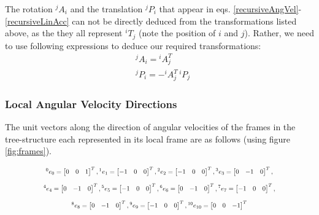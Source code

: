 \documentclass[a4paper,10pt]{article}
\newcommand\scalemath[2]{\scalebox{#1}{\mbox{\ensuremath{\displaystyle #2}}}}
\begin{document}
The rotation ${}^jA_i$ and the translation ${}^jP_i$ that appear in eqs. \ref{recursiveAngVel}-\ref{recursiveLinAcc} can not be directly deduced from the transformations listed above, as the they all represent ${}^iT_j$ (note the position of $i$ and $j$). Rather, we need to use following expressions to deduce our required transformations:
\begin{align}
 &{}^jA_i = {}^iA_j^T \nonumber \\ 
 &{}^jP_i = -{}^iA_j^T\,{}^iP_j \nonumber
\end{align}

\subsubsection{Local Angular Velocity Directions} \label{localAngVelDir}

The unit vectors along the direction of angular velocities of the frames in the tree-structure each represented in its local frame are as follows  (using figure \ref{fig:frames}).

\[
\scalemath{0.75}{{}^0e_0 = \left[\begin{matrix}0 & 0 & 1\end{matrix}\right]^T,
{}^1e_1 = \left[\begin{matrix}-1 & 0 & 0\end{matrix}\right]^T, 
{}^2e_2 = \left[\begin{matrix}-1 & 0 & 0\end{matrix}\right]^T, 
{}^3e_3 = \left[\begin{matrix}0 & -1 & 0\end{matrix}\right]^T,}
\]
\[
\scalemath{0.75}{{}^4e_4 = \left[\begin{matrix}0 & -1 & 0\end{matrix}\right]^T,
{}^5e_5 = \left[\begin{matrix}-1 & 0 & 0\end{matrix}\right]^T, 
{}^6e_6 = \left[\begin{matrix}0 & -1 & 0\end{matrix}\right]^T, 
{}^7e_7 = \left[\begin{matrix}-1 & 0 & 0\end{matrix}\right]^T,}
\]
\[
\scalemath{0.75}{{}^8e_8 = \left[\begin{matrix}0 & -1 & 0\end{matrix}\right]^T,
{}^9e_9 = \left[\begin{matrix}-1 & 0 & 0\end{matrix}\right]^T, 
{}^{10}e_{10} = \left[\begin{matrix}0 & 0 & -1\end{matrix}\right]^T}
\]
\end{document}
